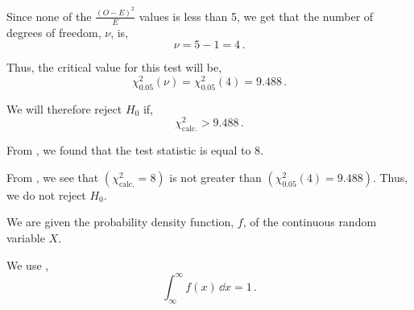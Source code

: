 \begin{subquestions}
\begin{subsubquestions}
Since none of the $\frac{(O-E)^2}{E}$ values is less than 5, we get that the number of degrees of freedom, $\nu$, is,
\begin{equation}
	\nu = 5-1=4 \,.
\end{equation}

Thus, the critical value for this test will be,
\begin{equation}
	\chi^{2}_{0.05} (\nu) = \chi^{2}_{0.05} (4) = 9.488 \,.
\end{equation}

We will therefore reject $H_0$ if,
\begin{equation}
	\chi^{2}_{\text{calc.}} > 9.488 \,. \label{2016:q4:CritReg}
\end{equation}


\subsubquestion

From , we found that the test statistic is equal to 8.


\subsubquestion

From , we see that $\left( \chi^{2}_{\text{calc.}}=8 \right)$ is not greater than $\left(\chi^{2}_{0.05} (4) = 9.488 \right)$. Thus, we do not reject $H_0$.

\end{subsubquestions}
	
	
\subquestion

We are given the probability density function, $f$, of the continuous random variable $X$.

\begin{subsubquestions}
	
\subsubquestion
We use ,
\begin{equation}
	\int_\infty^\infty f(x) \,\dd x = 1\,.
\end{equation}


\end{subsubquestions}
\end{subquestions}
